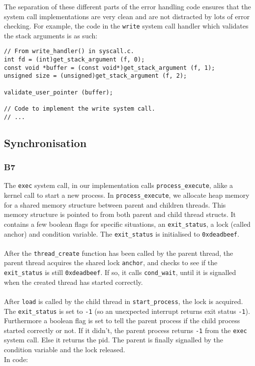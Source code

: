 \documentclass[a4wide, 11pt]{article}
\newcommand{\tx}{\texttt}
\begin{document}
The separation of these different parts of the error handling code ensures that the system call implementations are very clean and are not distracted by lots of error checking. For example, the code in the \tx{write} system call handler which validates the stack arguments is as such:

\begin{verbatim}
// From write_handler() in syscall.c.
int fd = (int)get_stack_argument (f, 0);
const void *buffer = (const void*)get_stack_argument (f, 1);
unsigned size = (unsigned)get_stack_argument (f, 2);

validate_user_pointer (buffer);

// Code to implement the write system call.
// ...
\end{verbatim}

\subsection{Synchronisation}
\subsubsection{B7}

The \tx{exec} system call, in our implementation calls \tx{process\_execute}, alike a kernel call to start a new process. In \tx{process\_execute}, we allocate heap memory for a shared memory structure between parent and children threads. This memory structure is pointed to from both parent and child thread structs. It contains a few boolean flags for specific situations, an \tx{exit\_status}, a lock (called anchor) and condition variable. The \tx{exit\_status} is initialised to \tx{0xdeadbeef}.
\\\\
After the \tx{thread\_create} function has been called by the parent thread, the parent thread acquires the shared lock \tx{anchor}, and checks to see if the \tx{exit\_status} is still \tx{0xdeadbeef}. If so, it calls \tx{cond\_wait}, until it is signalled when the created thread has started correctly.
\\\\
After \texttt{load} is called by the child thread in \tx{start\_process}, the lock is acquired. The \tx{exit\_status} is set to \tx{-1} (so an unexpected interrupt returns exit status \tx{-1}). Furthermore a boolean flag is set to tell the parent process if the child process started correctly or not. If it didn't, the parent process returns \tx{-1} from the \texttt{exec} system call. Else it returns the pid. The parent is finally signalled by the condition variable and the lock released.
\\
In code:
\end{document}
